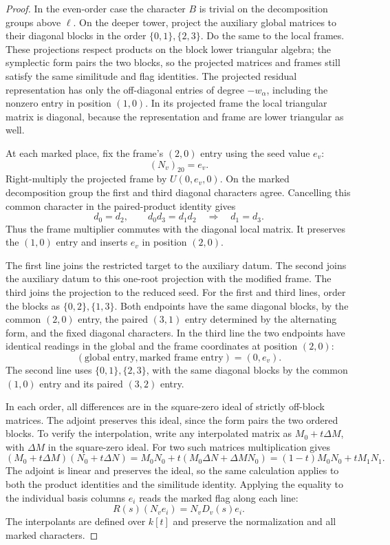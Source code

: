\begin{proof}
In the even-order case the character \(B\) is trivial on the
decomposition groups above \(\ell\). On the deeper tower,
project the auxiliary global matrices to their diagonal
blocks in the order \(\{0,1\},\{2,3\}\). Do the same
to the local frames. These projections respect products
on the block lower triangular algebra; the symplectic
form pairs the two blocks, so the projected matrices and
frames still satisfy the same similitude and flag
identities. The projected residual representation has
only the off-diagonal entries of degree \(-w_\alpha\),
including the nonzero entry in position \((1,0)\).
In its projected frame the local triangular matrix is
diagonal, because the representation and frame are
lower triangular as well.

At each marked place, fix the frame's \((2,0)\) entry using the seed value \(e_v\):
\[
 (N_v)_{20}=e_v .
\]
Right-multiply the projected frame by \(U(0,e_v,0)\).
On the marked decomposition group the first and third diagonal characters agree. Cancelling this common character in the paired-product identity gives
\[
 d_0=d_2,\qquad d_0d_3=d_1d_2\quad\Longrightarrow\quad d_1=d_3 .
\] Thus the frame multiplier commutes with the
diagonal local matrix. It preserves the \((1,0)\) entry
and inserts \(e_v\) in position \((2,0)\).

The first line joins the restricted target to the
auxiliary datum. The second joins the auxiliary datum
to this one-root projection with the modified frame.
The third joins the projection to the reduced seed.
For the first and third lines, order the blocks as
\(\{0,2\},\{1,3\}\). Both endpoints have the same
diagonal blocks, by the common \((2,0)\) entry, the
paired \((3,1)\) entry determined by the alternating
form, and the fixed diagonal characters. In the third line the two endpoints have identical readings in the global and the frame coordinates at position \((2,0)\):
\[
 (\text{global entry},\text{marked frame entry})=(0,e_v).
\] The second line uses
\(\{0,1\},\{2,3\}\), with the same diagonal blocks by
the common \((1,0)\) entry and its paired \((3,2)\)
entry.

In each order, all differences are in the
square-zero ideal of strictly off-block matrices.
The adjoint preserves this ideal, since the form
pairs the two ordered blocks. To verify the interpolation, write any interpolated matrix
as \(M_0+t\Delta M\), with \(\Delta M\) in the square-zero ideal.
For two such matrices multiplication gives
\[
 (M_0+t\Delta M)(N_0+t\Delta N)
 =M_0N_0+t(M_0\Delta N+\Delta M N_0)
 =(1-t)M_0N_0+tM_1N_1 .
\]
The adjoint is linear and preserves the ideal, so the same
calculation applies to both the product identities and the
similitude identity. Applying the equality to the individual basis columns \(e_i\) reads the marked flag along each line:
\[
 R(s)(N_v e_i)=N_vD_v(s)e_i .
\] The
interpolants are defined over \(k[t]\) and preserve
the normalization and all marked characters.


\end{proof}
